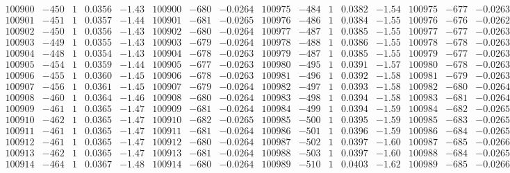 \documentclass[11pt,reqno,a4letter]{article}
\numberwithin{figure}{section}
\numberwithin{table}{section}
\theoremstyle{plain}
\numberwithin{theorem}{section}
\theoremstyle{definition}
\begin{document}
\begin{table}[ht!]
\begin{equation*}
{\begin{array}{ccccc|ccc||ccccc|ccc}
100900 & -450 & 1 & 0.0356 & -1.43 & 100900 & -680 & -0.0264 & 100975 & -484 & 1 & 0.0382 & -1.54 & 100975 & -677 & -0.0263  \\
100901 & -451 & 1 & 0.0357 & -1.44 & 100901 & -681 & -0.0265 & 100976 & -486 & 1 & 0.0384 & -1.55 & 100976 & -676 & -0.0262  \\
100902 & -450 & 1 & 0.0356 & -1.43 & 100902 & -680 & -0.0264 & 100977 & -487 & 1 & 0.0385 & -1.55 & 100977 & -677 & -0.0263  \\
100903 & -449 & 1 & 0.0355 & -1.43 & 100903 & -679 & -0.0264 & 100978 & -488 & 1 & 0.0386 & -1.55 & 100978 & -678 & -0.0263  \\
100904 & -448 & 1 & 0.0354 & -1.43 & 100904 & -678 & -0.0263 & 100979 & -487 & 1 & 0.0385 & -1.55 & 100979 & -677 & -0.0263  \\
100905 & -454 & 1 & 0.0359 & -1.44 & 100905 & -677 & -0.0263 & 100980 & -495 & 1 & 0.0391 & -1.57 & 100980 & -678 & -0.0263  \\
100906 & -455 & 1 & 0.0360 & -1.45 & 100906 & -678 & -0.0263 & 100981 & -496 & 1 & 0.0392 & -1.58 & 100981 & -679 & -0.0263  \\
100907 & -456 & 1 & 0.0361 & -1.45 & 100907 & -679 & -0.0264 & 100982 & -497 & 1 & 0.0393 & -1.58 & 100982 & -680 & -0.0264  \\
100908 & -460 & 1 & 0.0364 & -1.46 & 100908 & -680 & -0.0264 & 100983 & -498 & 1 & 0.0394 & -1.58 & 100983 & -681 & -0.0264  \\
100909 & -461 & 1 & 0.0365 & -1.47 & 100909 & -681 & -0.0264 & 100984 & -499 & 1 & 0.0394 & -1.59 & 100984 & -682 & -0.0265  \\
100910 & -462 & 1 & 0.0365 & -1.47 & 100910 & -682 & -0.0265 & 100985 & -500 & 1 & 0.0395 & -1.59 & 100985 & -683 & -0.0265  \\
100911 & -461 & 1 & 0.0365 & -1.47 & 100911 & -681 & -0.0264 & 100986 & -501 & 1 & 0.0396 & -1.59 & 100986 & -684 & -0.0265  \\
100912 & -461 & 1 & 0.0365 & -1.47 & 100912 & -680 & -0.0264 & 100987 & -502 & 1 & 0.0397 & -1.60 & 100987 & -685 & -0.0266  \\
100913 & -462 & 1 & 0.0365 & -1.47 & 100913 & -681 & -0.0264 & 100988 & -503 & 1 & 0.0397 & -1.60 & 100988 & -684 & -0.0265  \\
100914 & -464 & 1 & 0.0367 & -1.48 & 100914 & -680 & -0.0264 & 100989 & -510 & 1 & 0.0403 & -1.62 & 100989 & -685 & -0.0266  \\
\end{array}
}
\end{equation*} 

\end{table}
\clearpage 
\end{document}
